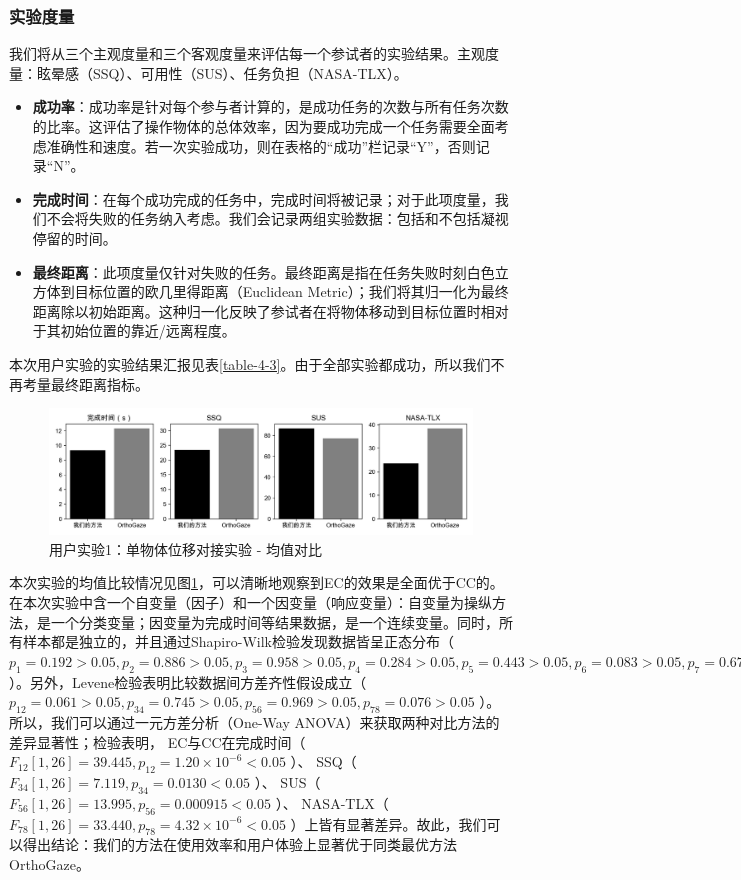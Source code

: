\subsubsection{实验度量}

我们将从三个主观度量和三个客观度量来评估每一个参试者的实验结果。主观度量：眩晕感（SSQ）、可用性（SUS）、任务负担（NASA-TLX）。

\begin{itemize}[wide]
	\item {\bf 成功率}：成功率是针对每个参与者计算的，是成功任务的次数与所有任务次数的比率。这评估了操作物体的总体效率，因为要成功完成一个任务需要全面考虑准确性和速度。若一次实验成功，则在表格的“成功”栏记录“Y”，否则记录“N”。
	\item {\bf 完成时间}：在每个成功完成的任务中，完成时间将被记录；对于此项度量，我们不会将失败的任务纳入考虑。我们会记录两组实验数据：包括和不包括凝视停留的时间。
	\item {\bf 最终距离}：此项度量仅针对失败的任务。最终距离是指在任务失败时刻白色立方体到目标位置的欧几里得距离（Euclidean Metric）；我们将其归一化为最终距离除以初始距离。这种归一化反映了参试者在将物体移动到目标位置时相对于其初始位置的靠近/远离程度。
\end{itemize}

本次用户实验的实验结果汇报见表\ref{table-4-3}。由于全部实验都成功，所以我们不再考量最终距离指标。

\begin{figure}[b!]
    \centering
    \includegraphics[width=\textwidth]{figure/user-study-1-avg.png}
    \caption{用户实验1：单物体位移对接实验 - 均值对比}
    \label{fig-4-2}
\end{figure}

本次实验的均值比较情况见图\ref{fig-4-2}，可以清晰地观察到EC的效果是全面优于CC的。在本次实验中含一个自变量（因子）和一个因变量（响应变量）：自变量为操纵方法，是一个分类变量；因变量为完成时间等结果数据，是一个连续变量。同时，所有样本都是独立的，并且通过Shapiro-Wilk检验发现数据皆呈正态分布（ $p_1 = 0.192 > 0.05, p_2 = 0.886 > 0.05, p_3 = 0.958 > 0.05, p_4 = 0.284 > 0.05, p_5 = 0.443 > 0.05, p_6 = 0.083 > 0.05, p_7 = 0.671 > 0.05, p_8 = 0.821 > 0.05$ ）。另外，Levene检验表明比较数据间方差齐性假设成立（ $p_{12} = 0.061 > 0.05, p_{34} = 0.745 > 0.05, p_{56} = 0.969 > 0.05, p_{78} = 0.076 > 0.05$ ）。所以，我们可以通过一元方差分析（One-Way ANOVA）来获取两种对比方法的差异显著性；检验表明，
EC与CC在完成时间（ $F_{12}[1, 26] = 39.445, p_{12} = 1.20 \times 10^{-6} < 0.05$ ）、
SSQ（ $F_{34}[1, 26] = 7.119, p_{34} = 0.0130 < 0.05$ ）、
SUS（ $F_{56}[1, 26] = 13.995, p_{56} = 0.000915 < 0.05$ ）、
NASA-TLX（ $F_{78}[1, 26] = 33.440, p_{78} = 4.32 \times 10^{-6} < 0.05$ ）上皆有显著差异。故此，我们可以得出结论：我们的方法在使用效率和用户体验上显著优于同类最优方法OrthoGaze。

